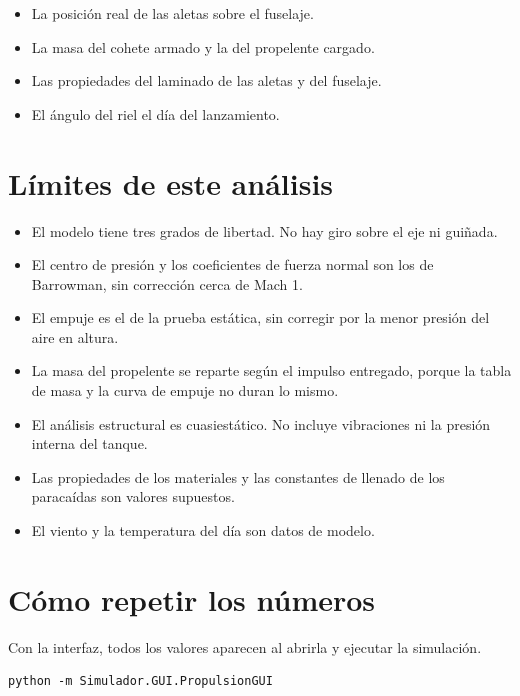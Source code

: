 \begin{itemize}
\tightlist
\item
  La posición real de las aletas sobre el fuselaje.
\item
  La masa del cohete armado y la del propelente cargado.
\item
  Las propiedades del laminado de las aletas y del fuselaje.
\item
  El ángulo del riel el día del lanzamiento.
\end{itemize}

\section{Límites de este
análisis}\label{luxedmites-de-este-anuxe1lisis}

\begin{itemize}
\tightlist
\item
  El modelo tiene tres grados de libertad. No hay giro sobre
  el eje ni guiñada.
\item
  El centro de presión y los coeficientes de fuerza normal
  son los de Barrowman, sin corrección cerca de Mach 1.
\item
  El empuje es el de la prueba estática, sin corregir por la
  menor presión del aire en altura.
\item
  La masa del propelente se reparte según el impulso
  entregado, porque la tabla de masa y la curva de empuje no
  duran lo mismo.
\item
  El análisis estructural es cuasiestático. No incluye
  vibraciones ni la presión interna del tanque.
\item
  Las propiedades de los materiales y las constantes de
  llenado de los paracaídas son valores supuestos.
\item
  El viento y la temperatura del día son datos de modelo.
\end{itemize}

\section{Cómo repetir los
números}\label{cuxf3mo-repetir-los-nuxfameros}

Con la interfaz, todos los valores aparecen al abrirla y
ejecutar la simulación.

\begin{verbatim}
python -m Simulador.GUI.PropulsionGUI
\end{verbatim}

